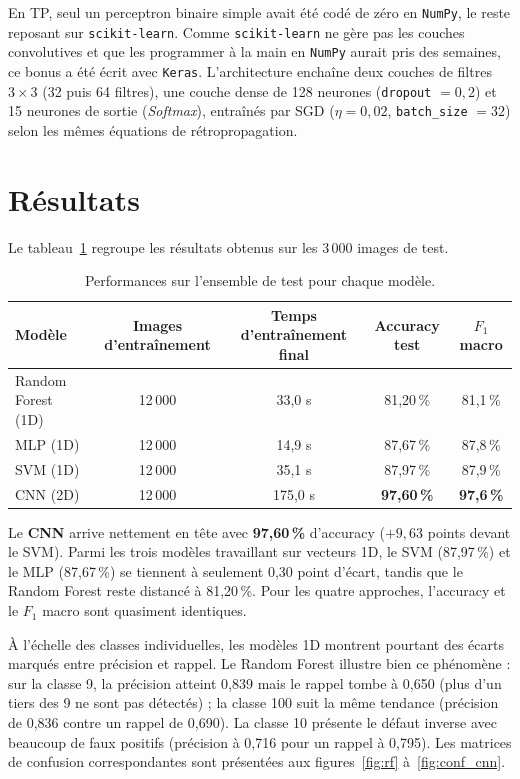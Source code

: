\documentclass[10pt,a4paper]{article}
\begin{document}
En TP, seul un perceptron binaire simple avait été codé de zéro en \texttt{NumPy}, le reste reposant sur \texttt{scikit-learn}. Comme \texttt{scikit-learn} ne gère pas les couches convolutives et que les programmer à la main en \texttt{NumPy} aurait pris des semaines, ce bonus a été écrit avec \texttt{Keras}. L'architecture enchaîne deux couches de filtres $3\times3$ (32 puis 64 filtres), une couche dense de 128 neurones (\texttt{dropout} $= 0{,}2$) et 15 neurones de sortie (\emph{Softmax}), entraînés par SGD ($\eta = 0{,}02$, \texttt{batch\_size} $= 32$) selon les mêmes équations de rétropropagation.

\section{Résultats}\label{sec:res}

Le tableau~\ref{tab:res} regroupe les résultats obtenus sur les 3\,000 images de test.

\begin{table}[H]
\centering
\caption{Performances sur l'ensemble de test pour chaque modèle.}
\label{tab:res}
\begin{tabular}{lcccc}
\toprule
\textbf{Modèle} & \textbf{Images d'entraînement} & \textbf{Temps d'entraînement final} & \textbf{Accuracy test} & \textbf{$F_1$ macro} \\
\midrule
Random Forest (1D) & 12\,000 & 33,0 s & 81,20\,\% & 81,1\,\% \\
MLP (1D) & 12\,000 & 14,9 s & 87,67\,\% & 87,8\,\% \\
SVM (1D) & 12\,000 & 35,1 s & 87,97\,\% & 87,9\,\% \\
CNN (2D) & 12\,000 & 175,0 s & \textbf{97,60\,\%} & \textbf{97,6\,\%} \\
\bottomrule
\end{tabular}
\end{table}

Le \textbf{CNN} arrive nettement en tête avec \textbf{97,60\,\%} d'accuracy ($+9{,}63$ points devant le SVM). Parmi les trois modèles travaillant sur vecteurs 1D, le SVM (87,97\,\%) et le MLP (87,67\,\%) se tiennent à seulement 0,30 point d'écart, tandis que le Random Forest reste distancé à 81,20\,\%. Pour les quatre approches, l'accuracy et le $F_1$ macro sont quasiment identiques.

À l'échelle des classes individuelles, les modèles 1D montrent pourtant des écarts marqués entre précision et rappel. Le Random Forest illustre bien ce phénomène : sur la classe 9, la précision atteint 0,839 mais le rappel tombe à 0,650 (plus d'un tiers des 9 ne sont pas détectés) ; la classe 100 suit la même tendance (précision de 0,836 contre un rappel de 0,690). La classe 10 présente le défaut inverse avec beaucoup de faux positifs (précision à 0,716 pour un rappel à 0,795). Les matrices de confusion correspondantes sont présentées aux figures~\ref{fig:rf} à~\ref{fig:conf_cnn}.
\end{document}
